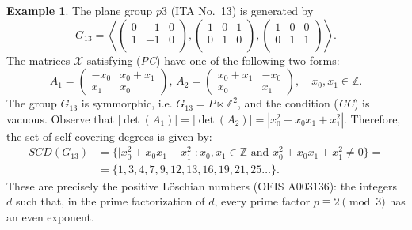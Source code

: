 \documentclass[draft]{adm-paper}
\theoremstyle{definition}
\newtheorem{example}{Example}
\begin{document}
\begin{example}
The plane group $p3$ (ITA No.~13) is generated by
\[
G_{13} = \left\langle\left(\begin{array}{rr|r}
0 & -1 & 0 \\
1 & -1 & 0 \\
\end{array}\right), \left(\begin{array}{rr|r}
1 & 0 & 1 \\
0 & 1 & 0 \\
\end{array}\right), \left(\begin{array}{rr|r}
1 & 0 & 0 \\
0 & 1 & 1 \\
\end{array}\right)\right\rangle.
\]
The matrices $\mathcal{X}$ satisfying (\textit{PC}) have one of the following two forms:
\[
A_1 = \left(\begin{array}{rr}
-x_{0} & x_{0} + x_{1} \\
x_{1} & x_{0}
\end{array}\right), \, A_2 = \left(\begin{array}{rr}
x_{0} + x_{1} & -x_{0} \\
x_{0} & x_{1}
\end{array}\right), \quad x_0,x_1 \in \mathbb{Z}.
\]
The group $G_{13}$ is symmorphic, i.e. $G_{13} = P \ltimes \mathbb{Z}^2$, and the condition (\textit{CC})
is vacuous. Observe that $|\det(A_1)|=|\det(A_2)|=|x_0^2 + x_0x_1 + x_1^2|$. Therefore, the set of self-covering degrees is given by:
\begin{align*}
SCD(G_{13}) &= \{ \vert{}x_0^2 + x_0x_1 + x_1^2\vert{} : x_0, x_1 \in \mathbb{Z} \text{ and } x_0^2 + x_0x_1 + x_1^2 \neq 0 \}=\\
&= \{ 1, 3, 4, 7, 9, 12, 13, 16, 19, 21, 25 \dots \}.
\end{align*}
These are precisely the positive L\"oschian numbers (OEIS A003136): the integers $d$ such that, in the prime factorization of $d$, every prime factor $p \equiv 2 \pmod 3$ has an even exponent.


\end{example}
\end{document}
